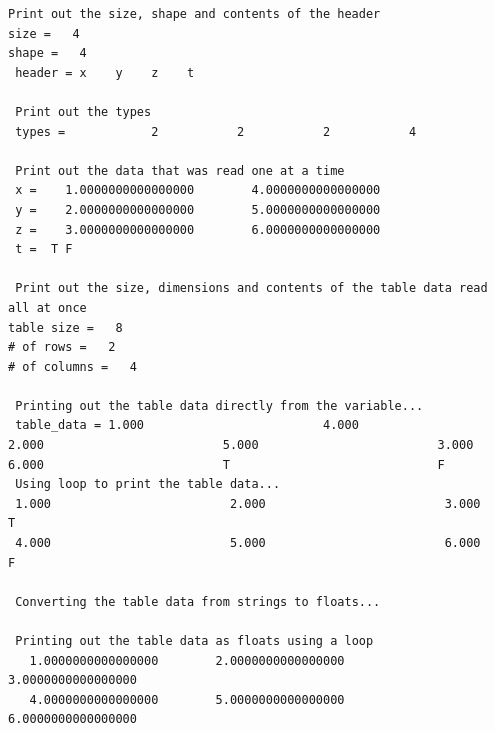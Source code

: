 \begin{verbatim}
Print out the size, shape and contents of the header
size =   4
shape =   4
 header = x    y    z    t    

 Print out the types
 types =            2           2           2           4

 Print out the data that was read one at a time
 x =    1.0000000000000000        4.0000000000000000     
 y =    2.0000000000000000        5.0000000000000000     
 z =    3.0000000000000000        6.0000000000000000     
 t =  T F

 Print out the size, dimensions and contents of the table data read all at once
table size =   8
# of rows =   2
# of columns =   4

 Printing out the table data directly from the variable...
 table_data = 1.000                         4.000                         2.000                         5.000                         3.000                         6.000                         T                             F                             
 Using loop to print the table data...
 1.000                         2.000                         3.000                         T                             
 4.000                         5.000                         6.000                         F                             

 Converting the table data from strings to floats...

 Printing out the table data as floats using a loop
   1.0000000000000000        2.0000000000000000        3.0000000000000000     
   4.0000000000000000        5.0000000000000000        6.0000000000000000
\end{verbatim}